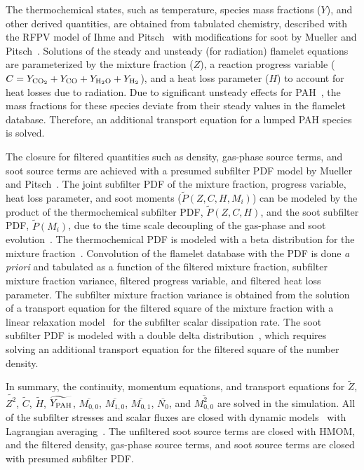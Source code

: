 \documentclass[review,3p,times]{elsarticle}
\begin{document}
The thermochemical states, such as temperature, species mass fractions ($Y$), and other derived quantities, are obtained from tabulated chemistry, described with the RFPV model of Ihme and Pitsch~\cite{ihme08} with modifications for soot by Mueller and Pitsch~\cite{mueller12}.  Solutions of the steady and unsteady (for radiation) flamelet equations are parameterized by the mixture fraction ($Z$), a reaction progress variable ($C = Y_{\rm CO_2} + Y_{\rm CO} + Y_{\rm H_2O} + Y_{\rm H_2}$), and a heat loss parameter ($H$) to account for heat losses due to radiation.  Due to significant unsteady effects for PAH~\cite{bisetti12}, the mass fractions for these species deviate from their steady values in the flamelet database.  Therefore, an additional transport equation for a lumped PAH species is solved.

The closure for filtered quantities such as density, gas-phase source terms, and soot source terms are achieved with a presumed subfilter PDF model by Mueller and Pitsch~\cite{mueller12, mueller11b}.  The joint subfilter PDF of the mixture fraction, progress variable, heat loss parameter, and soot moments ($\widetilde{P}\left(Z,C,H,M_i\right)$) can be modeled by the product of the thermochemical subfilter PDF, $\widetilde{P}\left(Z,C,H\right)$, and the soot subfilter PDF, $\widetilde{P}\left(M_i\right)$, due to the time scale decoupling of the gas-phase and soot evolution~\cite{mueller11b}.  The thermochemical PDF is modeled with a beta distribution for the mixture fraction~\cite{cook94}.  Convolution of the flamelet database with the PDF is done \emph{a priori} and tabulated as a function of the filtered mixture fraction, subfilter mixture fraction variance, filtered progress variable, and filtered heat loss parameter.  The subfilter mixture fraction variance is obtained from the solution of a transport equation for the filtered square of the mixture fraction with a linear relaxation model~\cite{ihme08b} for the subfilter scalar dissipation rate.  The soot subfilter PDF is modeled with a double delta distribution~\cite{mueller11b}, which requires solving an additional transport equation for the filtered square of the number density.

In summary, the continuity, momentum equations, and transport equations for $\widetilde{Z}$, $\widetilde{Z^2}$, $\widetilde{C}$, $\widetilde{H}$, $\widetilde{Y_{\rm PAH}}$, $\overline{M_{0,0}}$, $\overline{M_{1,0}}$, $\overline{M_{0,1}}$, $\overline{N_0}$, and $\overline{M^2_{0,0}}$ are solved in the simulation.  All of the subfilter stresses and scalar fluxes are closed with dynamic models~\cite{germano91} with Lagrangian averaging~\cite{meneveau96}.  The unfiltered soot source terms are closed with HMOM, and the filtered density, gas-phase source terms, and soot source terms are closed with presumed subfilter PDF.  
\end{document}
